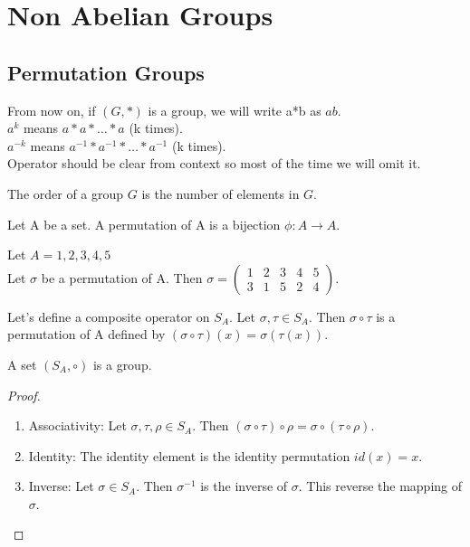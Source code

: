 \section{Non Abelian Groups}
\subsection{Permutation Groups}
\begin{note}[Notation]
    From now on, if $(G, *)$ is a group, we will write a*b as $ab$.\\
    $a^k$ means $a*a*\ldots*a$ (k times).\\
    $a^{-k}$ means $a^{-1} * a^{-1} * \ldots * a^{-1}$ (k times).\\
    Operator should be clear from context so most of the time we will omit it.
\end{note}

\begin{definition}
    The order of a group $G$ is the number of elements in $G$.
\end{definition}

\begin{definition}
    Let A be a set. A permutation of A is a bijection $\phi: A \to A$.
\end{definition}
\begin{eg}
    Let $A = {1, 2, 3, 4, 5}$\\
    Let $\sigma$ be a permutation of A. Then $\sigma = \begin{pmatrix} 1 & 2 & 3 & 4 & 5 \\ 3 & 1 & 5 & 2 & 4 \end{pmatrix}$.
\end{eg}

\begin{definition}
    Let's define a composite operator on $S_A$.
    Let $\sigma, \tau \in S_A$. Then $\sigma \circ \tau$ is a permutation of A defined by $(\sigma \circ \tau)(x) = \sigma(\tau(x))$.
\end{definition}

\begin{theorem}
    A set $(S_A, \circ)$ is a group.
\end{theorem}
\begin{proof}
    \vphantom{}\\
    \begin{enumerate}
        \item Associativity: Let $\sigma, \tau, \rho \in S_A$. Then $(\sigma \circ \tau) \circ \rho = \sigma \circ (\tau \circ \rho)$.
        \item Identity: The identity element is the identity permutation $id(x) = x$.
        \item Inverse: Let $\sigma \in S_A$. Then $\sigma^{-1}$ is the inverse of $\sigma$. This reverse the mapping of $\sigma$.
    \end{enumerate}
\end{proof}